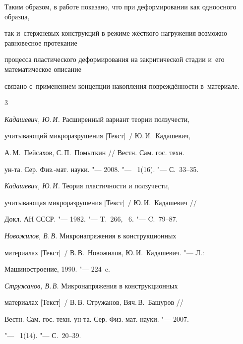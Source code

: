 Таким образом, в работе показано, что при деформировании как одноосного образца, 

так и~стержневых конструкций в режиме жёсткого нагружения возможно равновесное протекание 

процесса пластического деформирования на закритической стадии и~его математическое описание

связано с~применением концепции накопления повреждённости в~материале.







\begin{thebibliography}{3}




\emph{Кадашевич, Ю.\,И.} Расширенный вариант теории ползучести,

учитывающий микроразрушения [Текст]~/  Ю.\,И.~Кадашевич,

А.\,М.~Пейсахов, С.\,П.~Помыткин  /\!/ Вестн. Сам. гос. техн.

ун-та. Сер. Физ.-мат. науки. "--- 2008. "--- \No~1(16). "--- С.~33--35.




\emph{Кадашевич, Ю.\,И.} Теория пластичности и ползучести,

учитывающая микроразрушения [Текст]~/ Ю.\,И.~Кадашевич /\!/

Докл. АН СССР. "--- 1982. "--- T.~266, \No~6. "--- C.~79--87.




\emph{Новожилов, В.\,В.} Микронапряжения в конструкционных

материалах [Текст]~/ В.\,В.~Новожилов, Ю.\,И.~Кадашевич. "--- Л.:

Машиностроение, 1990. "--- 224~c.




\emph{Стружанов, В.\,В.} Микронапряжения в конструкционных

материалах [Текст]~/ В.\,В. Стружанов, Вяч.\,В.~Башуров /\!/

Вестн. Сам. гос. техн. ун-та. Сер. Физ.-мат. науки. "--- 2007.

"--- \No~1(14). "--- С.~20--39.





\end{thebibliography}
